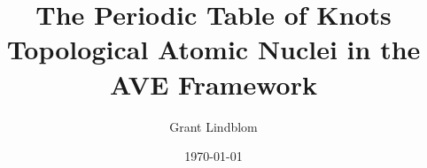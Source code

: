 \documentclass[11pt,letterpaper,twoside]{book}
\begin{document}
\frontmatter
\title{\textbf{The Periodic Table of Knots}\\ \Large{Topological Atomic Nuclei in the AVE Framework}}
\author{Grant Lindblom}
\date{\today}
\maketitle

\tableofcontents

\mainmatter

























\appendix



\backmatter


\end{document}
